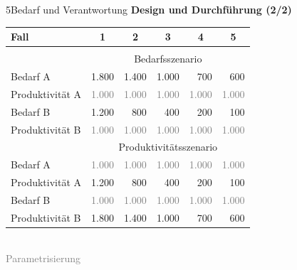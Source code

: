 \documentclass[xcolor=table,9pt,aspectratio=169]{beamer}
\begin{document}
\begin{frame}{\vspace*{10mm}5\hspace*{1em}Bedarf und Verantwortung}
\textbf{Design und Durchführung (2/2)}\\
\medskip
\begin{center}
   \begin{tabular}{lrrrrr}
      \arrayrulecolor{blue2}
      \hline
      Fall                      & \multicolumn{1}{c}{1}     & \multicolumn{1}{c}{2}     & \multicolumn{1}{c}{3}     & \multicolumn{1}{c}{4}   & \multicolumn{1}{c}{5}       \\
      \hline\hline\\[-0.5em]
                                & \multicolumn{5}{c}{Bedarfsszenario}                                                                                                       \\[0.5em]
      Bedarf A                  &                  1.800    &                  1.400    &                  1.000    &                    700    &                    600    \\
      Produktivität A           & \textcolor{gray}{1.000}   & \textcolor{gray}{1.000}   & \textcolor{gray}{1.000}   & \textcolor{gray}{1.000}   & \textcolor{gray}{1.000}   \\[0.5em]
      Bedarf B                  &                  1.200    &                    800    &                    400    &                    200    &                    100    \\
      Produktivität B           & \textcolor{gray}{1.000}   & \textcolor{gray}{1.000}   & \textcolor{gray}{1.000}   & \textcolor{gray}{1.000}   & \textcolor{gray}{1.000}   \\
      \hline
                                & \multicolumn{5}{c}{Produktivitätsszenario}                                                                                                \\[0.5em]
      Bedarf A                  & \textcolor{gray}{1.000}   & \textcolor{gray}{1.000}   & \textcolor{gray}{1.000}   & \textcolor{gray}{1.000}   & \textcolor{gray}{1.000}   \\
      Produktivität A           &                  1.200    &                    800    &                    400    &                    200    &                    100    \\[0.5em]
      Bedarf B                  & \textcolor{gray}{1.000}   & \textcolor{gray}{1.000}   & \textcolor{gray}{1.000}   & \textcolor{gray}{1.000}   & \textcolor{gray}{1.000}   \\
      Produktivität B           &                  1.800    &                  1.400    &                  1.000    &                    700    &                    600    \\
      \hline
   \end{tabular}\\
   \smallskip
   \textcolor{gray}{Parametrisierung}
\end{center}
\end{frame}
\end{document}
